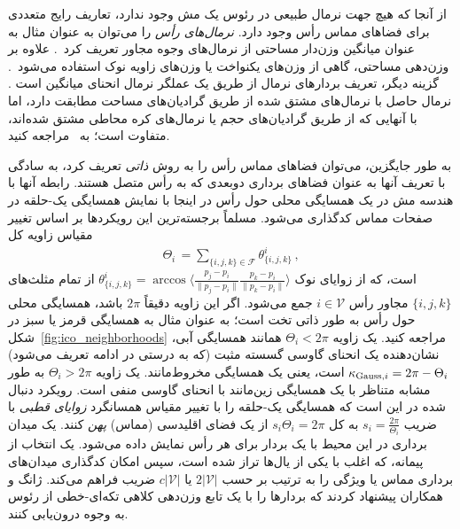 از آنجا که هیچ جهت نرمال طبیعی در رئوس یک مش وجود ندارد، تعاریف رایج متعددی برای فضاهای مماس رأس وجود دارد.
\emph{نرمال‌های رأس} را می‌توان به عنوان مثال به عنوان میانگین وزن‌دار مساحتی از نرمال‌های وجوه مجاور تعریف کرد~\cite{lipman2005linear,lai2009metric,deHaan2020meshCNNs}.
علاوه بر وزن‌دهی مساحتی، گاهی از وزن‌های یکنواخت یا وزن‌های زاویه نوک استفاده می‌شود~\cite{craneDiscreteDifferentialGeometry2014}.
گزینه دیگر، تعریف بردارهای نرمال از طریق یک عملگر نرمال انحنای میانگین است \cite{meyer2003discrete}.
نرمال حاصل با نرمال‌های مشتق شده از طریق گرادیان‌های مساحت مطابقت دارد، اما با آنهایی که از طریق گرادیان‌های حجم یا نرمال‌های کره محاطی مشتق شده‌اند، متفاوت است؛ به~\cite{craneDiscreteDifferentialGeometry2014} مراجعه کنید.


به طور جایگزین، می‌توان فضاهای مماس رأس را به روش \emph{ذاتی} تعریف کرد، به سادگی با تعریف آنها به عنوان فضاهای برداری دوبعدی که به رأس متصل هستند.
رابطه آنها با هندسه مش در یک همسایگی محلی حول رأس در اینجا با نمایش همسایگی یک-حلقه در صفحات مماس کدگذاری می‌شود.
مسلماً برجسته‌ترین این رویکردها بر اساس تغییر مقیاس زاویه کل
\begin{align}\label{eq:mesh_total_incident_angle}
    \Theta_i \,=\! \sum_{\{i,j,k\}\in\mathcal{F}} \theta_{\{i,j,k\}}^i \,,
\end{align}
است، که از زوایای نوک
$\theta_{\{i,j,k\}}^i = \arccos \big\langle \frac{p_j-p_i}{\lVert p_j-p_i\rVert} \frac{p_k-p_i}{\lVert p_k-p_i\rVert} \big\rangle$
از تمام مثلث‌های $\{i,j,k\}$ مجاور رأس $i\in\mathcal{V}$ جمع می‌شود.
اگر این زاویه دقیقاً $2\pi$ باشد، همسایگی محلی حول رأس به طور ذاتی تخت است؛ به عنوان مثال به همسایگی قرمز یا سبز در شکل~\ref{fig:ico_neighborhoods} مراجعه کنید.
یک زاویه $\Theta_i < 2\pi$ همانند همسایگی آبی، نشان‌دهنده یک انحنای گاوسی گسسته مثبت (که به درستی در ادامه تعریف می‌شود) $\kappa_{\textup{Gauss},i} = 2\pi - \Theta_i$ است، یعنی یک همسایگی مخروط‌مانند.
یک زاویه $\Theta_i > 2\pi$ به طور مشابه متناظر با یک همسایگی زین‌مانند با انحنای گاوسی منفی است.
رویکرد دنبال شده در
\cite{polthier1998straightest,zhang2006vectorFieldDesign,Knoppel:2013:GOD,Sharp2019VectorHeatMethod,craneDiscreteDifferentialGeometry2014}
این است که همسایگی یک-حلقه را با تغییر مقیاس همسانگرد \emph{زوایای قطبی} با ضریب $s_i = \frac{2\pi}{\Theta_i}$ به کل $s_i \Theta_i = 2\pi$ از یک فضای اقلیدسی (مماس) \emph{پهن} کنند.
یک میدان برداری در این محیط با یک بردار برای هر رأس نمایش داده می‌شود.
یک انتخاب از پیمانه، که اغلب با یکی از یال‌ها تراز شده است، سپس امکان کدگذاری میدان‌های برداری مماس یا ویژگی را به ترتیب بر حسب $2|\mathcal{V}|$ یا $c|\mathcal{V}|$ ضریب فراهم می‌کند.
ژانگ و همکاران\cite{zhang2006vectorFieldDesign} پیشنهاد کردند که بردارها را با یک تابع وزن‌دهی کلاهی تکه‌ای-خطی از رئوس به وجوه درون‌یابی کنند.
